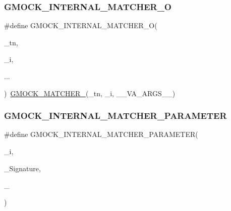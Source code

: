 \subsubsection{\texorpdfstring{GMOCK\_INTERNAL\_MATCHER\_O}{GMOCK\_INTERNAL\_MATCHER\_O}}
{\footnotesize\ttfamily \#define G\+M\+O\+C\+K\+\_\+\+I\+N\+T\+E\+R\+N\+A\+L\+\_\+\+M\+A\+T\+C\+H\+E\+R\+\_\+O(\begin{DoxyParamCaption}\item[{}]{\+\_\+tn,  }\item[{}]{\+\_\+i,  }\item[{}]{... }\end{DoxyParamCaption})~\mbox{\hyperlink{_obj__test_2lib_2googletest-release-1_88_81_2googlemock_2include_2gmock_2gmock-generated-function-mockers_8h_aa87d0009fe91f1c89d658776b55a769c}{G\+M\+O\+C\+K\+\_\+\+M\+A\+T\+C\+H\+E\+R\+\_\+}}(\+\_\+tn, \+\_\+i, \+\_\+\+\_\+\+V\+A\+\_\+\+A\+R\+G\+S\+\_\+\+\_\+)}

\mbox{\label{googletest-master_2googlemock_2include_2gmock_2gmock-function-mocker_8h_a2d8d1ef12c162a39811ce0b14a3f8979}} 
\subsubsection{\texorpdfstring{GMOCK\_INTERNAL\_MATCHER\_PARAMETER}{GMOCK\_INTERNAL\_MATCHER\_PARAMETER}}
{\footnotesize\ttfamily \#define G\+M\+O\+C\+K\+\_\+\+I\+N\+T\+E\+R\+N\+A\+L\+\_\+\+M\+A\+T\+C\+H\+E\+R\+\_\+\+P\+A\+R\+A\+M\+E\+T\+ER(\begin{DoxyParamCaption}\item[{}]{\+\_\+i,  }\item[{}]{\+\_\+\+Signature,  }\item[{}]{\+\_\+ }\end{DoxyParamCaption})}

